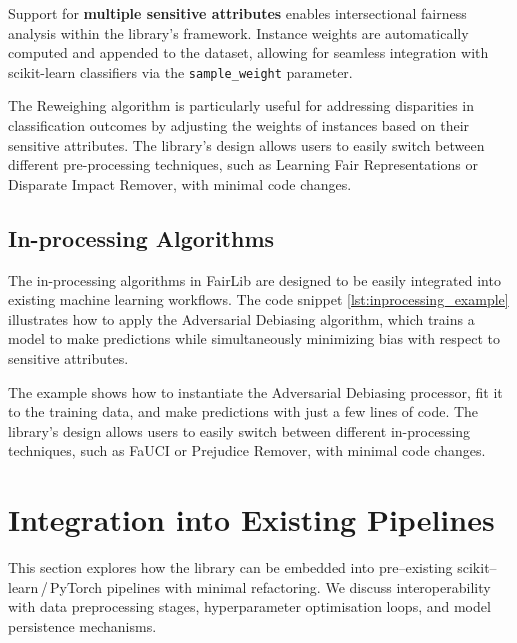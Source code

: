 \documentclass[12pt,a4paper,openright,twoside]{book}
\begin{document}


Support for \textbf{multiple sensitive attributes} enables intersectional fairness analysis within the library’s framework. Instance weights are automatically computed and appended to the dataset, allowing for seamless integration with scikit-learn classifiers via the \texttt{sample\_weight} parameter.

The Reweighing algorithm is particularly useful for addressing disparities in classification outcomes by adjusting the weights of instances based on their sensitive attributes. The library's design allows users to easily switch between different pre-processing techniques, such as Learning Fair Representations or Disparate Impact Remover, with minimal code changes.

\subsection{In-processing Algorithms}
The in-processing algorithms in FairLib are designed to be easily integrated into existing machine learning workflows. The code snippet \ref{lst:inprocessing_example} illustrates how to apply the Adversarial Debiasing algorithm, which trains a model to make predictions while simultaneously minimizing bias with respect to sensitive attributes.



The example shows how to instantiate the Adversarial Debiasing processor, fit it to the training data, and make predictions with just a few lines of code. The library's design allows users to easily switch between different in-processing techniques, such as FaUCI or Prejudice Remover, with minimal code changes.


\section{Integration into Existing Pipelines}
This section explores how the library can be embedded into pre--existing scikit--learn\,/\,PyTorch pipelines with minimal refactoring. We discuss interoperability with data preprocessing stages, hyperparameter optimisation loops, and model persistence mechanisms.
\end{document}
